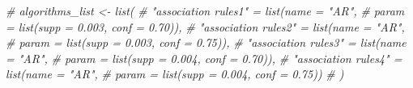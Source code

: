 \documentclass[
]{article}
\newenvironment{Shaded}{\begin{snugshade}}{\end{snugshade}}
\newcommand{\AlertTok}[1]{\textcolor[rgb]{0.94,0.16,0.16}{#1}}
\newcommand{\CommentTok}[1]{\textcolor[rgb]{0.56,0.35,0.01}{\textit{#1}}}
\begin{document}
\begin{Shaded}
\begin{Highlighting}[]
\CommentTok{# algorithms_list <- list(}
\CommentTok{#     "association rules1"  = list(name  = "AR",}
\CommentTok{#                                    param = list(supp = 0.003, conf = 0.70)),}
\CommentTok{#     "association rules2"  = list(name  = "AR",}
\CommentTok{#                                    param = list(supp = 0.003, conf = 0.75)),}
\CommentTok{#     "association rules3"  = list(name  = "AR",}
\CommentTok{#                                   param = list(supp = 0.004, conf = 0.70)),}
\CommentTok{#     "association rules4"  = list(name  = "AR",}
\CommentTok{#                                   param = list(supp = 0.004, conf = 0.75))}
\CommentTok{#  )}
\end{Highlighting}
\end{Shaded}

\begin{Shaded}
\end{Shaded}
\end{document}
